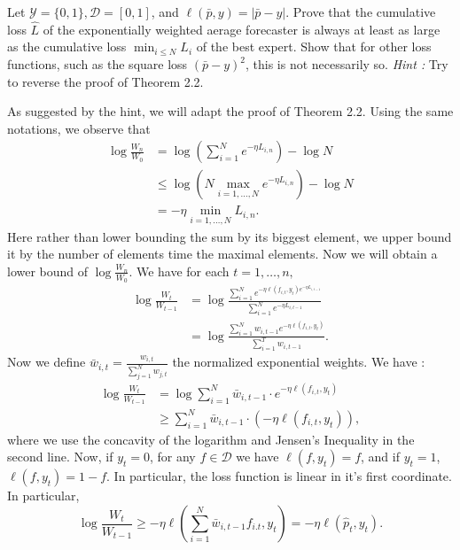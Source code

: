 \begin{exercise}[]{}
	Let $ \mathcal{Y} = \{ 0,1 \}, \mathcal{D} = [0,1] $, and $ \ell(\bar{p},y) = |\bar{p}-y| $. Prove that the cumulative loss $ \hat{L} $ of the exponentially weighted aerage forecaster is always at least as large as the cumulative loss $ \min_{i \leq N}L_i $ of the best expert. Show that for other loss functions, such as the square loss $ (\bar{p}-y)^2 $, this is not necessarily so. \textit{Hint :} Try to reverse the proof of Theorem 2.2. 
\end{exercise}

\begin{solution}[]
	As suggested by the hint, we will adapt the proof of Theorem 2.2. Using the same notations, we observe that 
\begin{align*}
	\log \frac{W_n}{W_0} &= \log\left(\sum_{i=1}^{N}e^{-\eta L_{i,n}}\right) - \log N \\
	&\leq \log \left( N \max_{i=1,\ldots,N}e^{-\eta L_{i,n}} \right) - \log N\\
	&= - \eta \min_{i=1,\ldots,N} L_{i,n}.
\end{align*}
Here rather than lower bounding the sum by its biggest element, we upper bound it by the number of elements time the maximal elements. Now we will obtain a lower bound of $ \log \frac{W_n}{W_0} $. We have for each $ t=1,\ldots,n, $
\begin{align*}
	\log \frac{W_t}{W_{t-1}} &= \log \frac{\sum_{i=1}^{N}e^{- \eta \ell(f_{i,t},y_t)e^{-\eta L_{i,t-1}}}}{\sum_{i=1}^{N}e^{-\eta L_{i,t-1}}}\\
				 &= \log \frac{\sum_{i=1}^{N}w_{i,t-1}e^{-\eta\ell(f_{i,t},y_t)}}{\sum_{i=1}^{T}w_{i,t-1}}.
\end{align*}
Now we define $ \bar{w}_{i,t} = \frac{w_{i,t}}{\sum_{j=1}^{N}w_{j,t}} $ the normalized exponential weights. We have :
\begin{align*}
	\log \frac{W_t}{W_{t-1}} &= \log \sum_{i=1}^{N} \bar{w}_{i ,t-1}\cdot e^{-\eta\ell(f_{i ,t},y_t)}\\
				 &\geq \sum_{i=1}^{N}\bar{w}_{i ,t-1}\cdot (-\eta\ell(f_{i ,t},y_t)),
\end{align*}
where we use the concavity of the logarithm and Jensen's Inequality in the second line. Now, if $ y_t = 0 $, for any $ f\in \mathcal{D} $ we have $ \ell(f, y_t) = f $, and if $ y_t =1 $, $ \ell(f,y_t) = 1-f $. In particular, the loss function is linear in it's first coordinate. In particular,
\begin{equation*}
	\log \frac{W_t}{W_{t-1}} \geq  -\eta \ell(\sum_{i=1}^{N}\bar{w}_{i,t-1}f_{i.t},y_t) = -\eta \ell(\hat{p}_t,y_t).

\end{equation*}
\end{solution}
